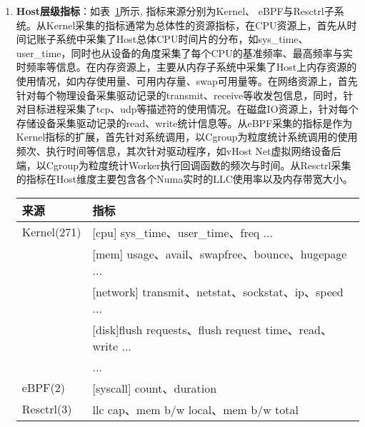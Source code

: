 \begin{enumerate}
    \item \textbf{Host层级指标}：如表~\ref{tab:host_metric}所示, 指标来源分别为Kernel、
eBPF与Resctrl子系统。从Kernel采集的指标通常为总体性的资源指标，在CPU资源上，首先从时间记账子系统中采集了Host总体CPU时间片的分布，如sys\_time、user\_time，同时也从设备的角度采集了每个CPU的基准频率、最高频率与实时频率等信息。在内存资源上，主要从内存子系统中采集了Host上内存资源的使用情况，如内存使用量、可用内存量、swap可用量等。在网络资源上，首先针对每个物理设备采集驱动记录的transmit、receive等收发包信息，同时，针对目标进程采集了tcp、udp等描述符的使用情况。在磁盘IO资源上，针对每个存储设备采集驱动记录的read、write统计信息等。从eBPF采集的指标是作为Kernel指标的扩展，首先针对系统调用，以Cgroup为粒度统计系统调用的使用频次、执行时间等信息，其次针对驱动程序，如vHost Net虚拟网络设备后端，以Cgroup为粒度统计Worker执行回调函数的频次与时间。从Resctrl采集的指标在Host维度主要包含各个Numa实时的LLC使用率以及内存带宽大小。

\begin{table}[!htbp]
    \label{tab:host_metric}
    \footnotesize%
    \setlength{\tabcolsep}{4pt}%
    \renewcommand{\arraystretch}{1.25}%
    \centering
    \begin{tabular}{ll}
        \hline
        来源 & 指标\\
        \hline
        Kernel(271) & [cpu] sys\_time、user\_time、freq ... \\
        & [mem] usage、avail、swapfree、bounce、hugepage ...\\
        & [network] transmit、netstat、sockstat、ip、speed ...\\
        & [disk]flush requests、flush request time、read、write ...\\
        & ...\\
        eBPF(2) & [syscall] count、duration\\
        Resctrl(3) & llc cap、mem b/w local、mem b/w total\\
        \hline
    \end{tabular}
\end{table}


\end{enumerate}
